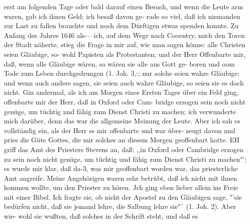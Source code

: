 erst am folgenden Tage oder bald darauf einen Besuch, und wenn
die Leute arm waren, gab ich ihnen Geld; ich besaß davon ge-
rade so viel, daß ich niemanden zur Last zu fallen brauchte und
noch dem Dürftigen etwas spenden konnte.
Zu Anfang des Jahres 1646 als-—ich, auf dem Wege nach
Cooentry, mich den Toren der Stadt näherte, stieg die Frage in
mir auf, wie man sagen könne: alle Christen seien Gläubige, so-
wohl Papisten als Protestanten; und der Herr Offenbarte mir,
daß, wenn alle Gläubige wären, so wären sie alle aus Gott ge-
boren und oom Tode zum Leben durchgedrungen (1. Joh. 3,:;
nur solche seien wahre Gläubige; und wenn auch andere sagen,
sie seien auch wahre Gläubige, so seien sie es doch nicht.
Gin andermal, als ich am Morgen eines Ersten Tages über
ein Feld ging, offenbarte mir der Herr, daß in Oxford oder Cam-
bridge erzogen sein noch nicht genüge, um tüchtig nnd fähig zum
Dienst Christi zu machen; ich verwunderte mich darüber, denn
das war die allgemeine Meinung der Leute. Aber ich sah es
vollständig ein, als der Herr es mir offenbarte und war über-
zeugt davon nnd pries die Güte Gottes, die mir solches an diesem
Morgen geoffenbart hatte. EH griff das Amt des Priesters Stevens
an, daß: ,,in Oxford oder Cambridge erzogen zu sein noch nicht
genüge, um tüchtig und fähig zum Dienst Christi zu machen"'; es
wurde mir klar, daß da-3, was mir geoffenbart worden war, das
priesterliche Amt angreife. Meine Angehörigen waren sehr betrübt,
daß ich nicht mit ihnen kommen wollte, um den Priester zu hören.
Jch ging eben lieber allein ins Freie mit einer Bibel. Ich fragte sie,
ob nicht der Apostel zu den Gläubigen sage, "'sie bedürfen nicht, daß
sie jemand lehre, die Salbung lehre sie"` (1. Joh. 2). Aber wie-
wohl sie wußten, daß solches in der Schrift steht, und daß es



